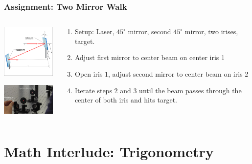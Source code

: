 \documentclass{beamer}
\begin{document}
\begin{frame}\frametitle{Assignment: Two Mirror Walk}
\begin{columns}
\begin{column}{4cm}
\begin{center}
\includegraphics[width=3cm]{fig/twoMirror.jpg}

\vspace{1cm}
\includegraphics[width=4cm]{fig/twoMirror2.jpg}

\end{center}
\end{column}
\begin{column}{7.5cm}
\begin{enumerate}
\item Setup: Laser, $45^{\circ}$ mirror, second $45^{\circ}$ mirror, two irises, target.
\item Adjust first mirror to center beam on center iris 1
\item Open iris 1, adjust second mirror to center beam on iris 2
\item Iterate steps 2 and 3 until the beam passes through the center of both iris and hits target.
\end{enumerate}
\end{column}
\end{columns}

\end{frame}

\section{Math Interlude: Trigonometry}
\end{document}
